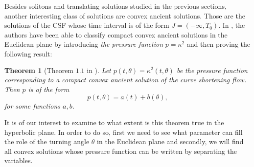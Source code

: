 \documentclass[12pt]{amsart}
\theoremstyle{plain}
\newtheorem{theorem}{Theorem}[section]
\theoremstyle{definition}
\begin{document}
Besides solitons and translating solutions   studied in the previous sections, another interesting class of solutions are convex ancient solutions. Those are the solutions of the CSF whose time interval is of the form $J = ( -\infty, T_0 ).$ In \cite{dhs}, the authors have been able to classify compact convex ancient solutions in the Euclidean plane by introducing \textit{the pressure function} $p = \kappa^2$ and then proving the following result:

\begin{theorem}[Theorem $1.1$ in \cite{dhs}]
Let $p(t, \theta) = \kappa^2(t, \theta)$ be the pressure function corresponding to a compact convex ancient solution of the curve shortening flow. Then $p$ is of the form $$p(t, \theta) = a(t) + b(\theta),$$ for some functions $a,b$.
\end{theorem}  
It is of our interest to examine to what extent is this theorem true in the hyperbolic plane. In order to do so, first we need to see what parameter can fill the role of the turning angle $\theta$ in the Euclidean plane and secondly, we will find all convex solutions whose pressure function can be written by separating the variables.
\end{document}
